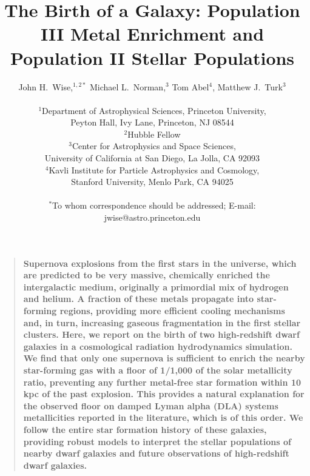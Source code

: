 \documentclass[12pt]{article}
\title{The Birth of a Galaxy: Population III Metal Enrichment and
  Population II Stellar Populations}
\author
{John H.~Wise,$^{1,2\ast}$ Michael L.~Norman,$^{3}$ Tom Abel$^{4}$,
Matthew J.~Turk$^{3}$\\
\\
\normalsize{$^{1}$Department of Astrophysical Sciences, Princeton
University,}\\
\normalsize{Peyton Hall, Ivy Lane, Princeton, NJ 08544}\\
\normalsize{$^{2}$Hubble Fellow}\\
\normalsize{$^{3}$Center for Astrophysics and Space Sciences,}\\
\normalsize{University of California at San Diego, La Jolla, CA 92093}\\
\normalsize{$^{4}$Kavli Institute for Particle Astrophysics and
  Cosmology, }\\
\normalsize{Stanford University, Menlo Park, CA 94025}\\
\\
\normalsize{$^\ast$To whom correspondence should be addressed; E-mail:
jwise@astro.princeton.edu}
}
\date{}
\newenvironment{sciabstract}{%
\begin{quote} \bf}
{\end{quote}}
\begin{document}
 


\baselineskip24pt


\maketitle 


\begin{sciabstract}
  Supernova explosions from the first stars in the universe, which are
  predicted to be very massive, chemically enriched the intergalactic
  medium, originally a primordial mix of hydrogen and helium.  A
  fraction of these metals propagate into star-forming regions,
  providing more efficient cooling mechanisms and, in turn, increasing
  gaseous fragmentation in the first stellar clusters.  Here, we
  report on the birth of two high-redshift dwarf galaxies in a
  cosmological radiation hydrodynamics simulation.  We find that only
  one supernova is sufficient to enrich the nearby star-forming gas
  with a floor of 1/1,000 of the solar metallicity ratio, preventing
  any further metal-free star formation within 10 kpc of the past
  explosion.  This provides a natural explanation for the observed
  floor on damped Lyman alpha (DLA) systems metallicities reported in
  the literature, which is of this order.  We follow the entire star
  formation history of these galaxies, providing robust models to
  interpret the stellar populations of nearby dwarf galaxies and
  future observations of high-redshift dwarf galaxies.
\end{sciabstract}

\end{document}

